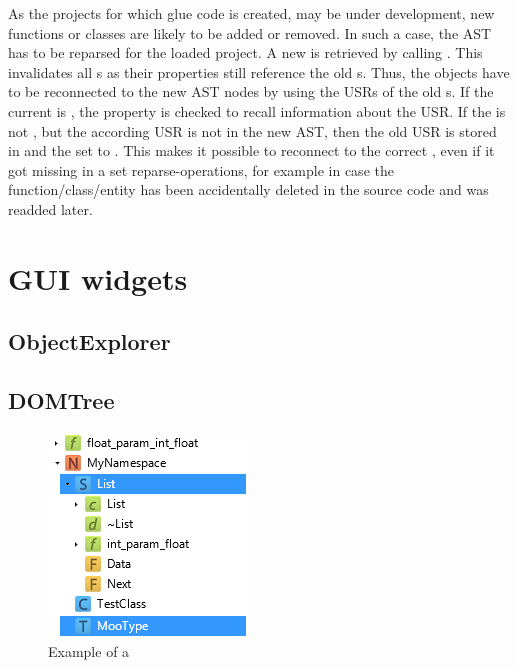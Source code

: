 As the  projects for which glue code is created, may be under development, new functions or classes are likely to be added or removed. In such a case, the  AST has to be reparsed for the loaded project. A new  is retrieved by calling . This invalidates all s as their  properties still reference the old s. Thus, the objects have to be reconnected to the new AST nodes by using the USRs of the old s. If the current  is , the  property is checked to recall information about the USR. If the  is not , but the according USR is not in the new AST, then the old USR is stored in  and the  set to . This makes it possible to reconnect to the correct , even if it got missing in a set reparse-operations, for example in case the  function/class/entity has been accidentally deleted in the source code and was readded later.

\section{GUI widgets}

\subsection{ObjectExplorer}
\label{sec:ObjectExplorer}

\subsection{DOMTree}

\begin{figure}
  \begin{center}
    \includegraphics[scale=0.75]{Images/DOMTree.png}
  \end{center}
  \caption{Example of a }
  \label{fig:DOMTree}
   \vspace{-15pt}
\end{figure}

